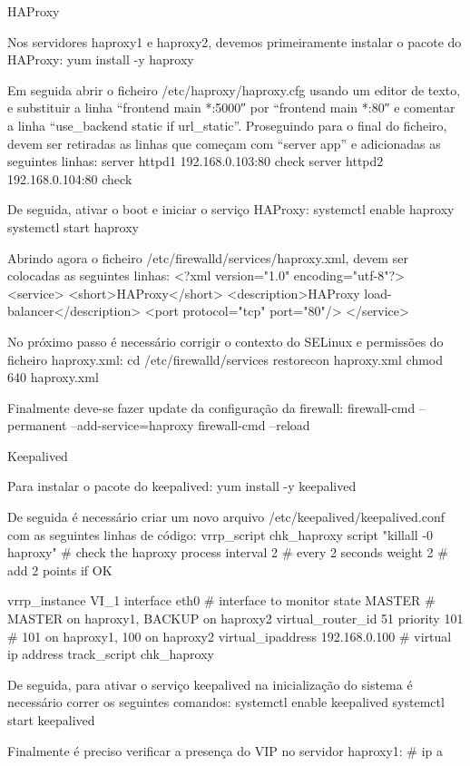 HAProxy

Nos servidores haproxy1 e haproxy2, devemos primeiramente instalar o pacote do HAProxy:
yum install -y haproxy

Em seguida abrir o ficheiro /etc/haproxy/haproxy.cfg usando um editor de texto, e substituir a linha “frontend  main *:5000″ por “frontend  main *:80″ e comentar a linha “use_backend static if url_static”.
Proseguindo para o final do ficheiro, devem ser retiradas as linhas que começam com “server app” e adicionadas as seguintes linhas:
server httpd1 192.168.0.103:80 check
server httpd2 192.168.0.104:80 check

De seguida, ativar o boot e iniciar o serviço HAProxy:
systemctl enable haproxy
systemctl start haproxy

Abrindo agora o ficheiro /etc/firewalld/services/haproxy.xml, devem ser colocadas as seguintes linhas:
<?xml version="1.0" encoding="utf-8"?>
<service>
<short>HAProxy</short>
<description>HAProxy load-balancer</description>
<port protocol="tcp" port="80"/>
</service>

No próximo passo é necessário corrigir o contexto do SELinux e permissões do ficheiro haproxy.xml:
cd /etc/firewalld/services
restorecon haproxy.xml
chmod 640 haproxy.xml

Finalmente deve-se fazer update da configuração da firewall:
firewall-cmd --permanent --add-service=haproxy
firewall-cmd --reload


Keepalived

Para instalar o pacote do keepalived:
yum install -y keepalived

De seguida é necessário criar um novo arquivo /etc/keepalived/keepalived.conf com as seguintes linhas de código:
vrrp_script chk_haproxy {
  script "killall -0 haproxy" # check the haproxy process
  interval 2 # every 2 seconds
  weight 2 # add 2 points if OK
}

vrrp_instance VI_1 {
  interface eth0 # interface to monitor
  state MASTER # MASTER on haproxy1, BACKUP on haproxy2
  virtual_router_id 51
  priority 101 # 101 on haproxy1, 100 on haproxy2
  virtual_ipaddress {
    192.168.0.100 # virtual ip address 
  }
  track_script {
    chk_haproxy
  }
}

De seguida, para ativar o serviço keepalived na inicialização do sistema é necessário correr os seguintes comandos:
systemctl enable keepalived
systemctl start keepalived

Finalmente é preciso verificar a presença do VIP no servidor haproxy1:
# ip a

